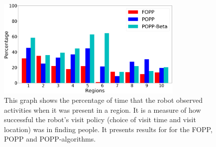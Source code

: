 \begin{figure}[t!]
	\centering
	\includegraphics[width=0.8\textwidth]{./figures/exploration_percentage_region.png}
	\caption{This graph shows the percentage of time that the robot observed activities when it was present in a region. It is a measure of how successful the robot's visit policy (choice of visit time and visit location) was in finding people. It presents results for for the FOPP, POPP and POPP-algorithms. %
	}
	\label{fig:exploration_percentage_region}
	\vspace{-15pt}
\end{figure}



